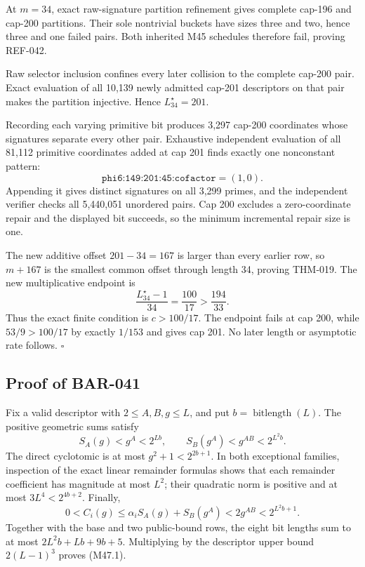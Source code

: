 \documentclass[11pt]{article}
\begin{document}
At \(m=34\), exact raw-signature partition refinement gives complete cap-196
and cap-200 partitions. Their sole nontrivial buckets have sizes three and
two, hence three and one failed pairs. Both inherited M45 schedules
therefore fail, proving REF-042.

Raw selector inclusion confines every later collision to the complete
cap-200 pair. Exact evaluation of all 10,139 newly admitted cap-201
descriptors on that pair makes the partition injective. Hence
\(L_{34}^{\star}=201\).

Recording each varying primitive bit produces 3,297 cap-200 coordinates
whose signatures separate every other pair. Exhaustive independent
evaluation of all 81,112 primitive coordinates added at cap 201 finds
exactly one nonconstant pattern:
\[
\texttt{phi6:149:201:45:cofactor}=(1,0).
\]
Appending it gives distinct signatures on all 3,299 primes, and the
independent verifier checks all 5,440,051 unordered pairs. Cap 200 excludes
a zero-coordinate repair and the displayed bit succeeds, so the minimum
incremental repair size is one.

The new additive offset \(201-34=167\) is larger than every earlier row, so
\(m+167\) is the smallest common offset through length 34, proving THM-019.
The new multiplicative endpoint is
\[
\frac{L_{34}^{\star}-1}{34}=\frac{100}{17}>\frac{194}{33}.
\]
Thus the exact finite condition is \(c>100/17\). The endpoint fails at cap
200, while \(53/9>100/17\) by exactly \(1/153\) and gives cap 201. No later
length or asymptotic rate follows. \(\square\)

\subsection{Proof of BAR-041}
\label{proof:BAR-041}

Fix a valid descriptor with \(2\le A,B,g\le L\), and put
\(b=\operatorname{bitlength}(L)\). The positive geometric sums satisfy
\[
S_A(g)<g^A<2^{Lb},\qquad
S_B(g^A)<g^{AB}<2^{L^2b}.
\]
The direct cyclotomic is at most \(g^2+1<2^{2b+1}\). In both exceptional
families, inspection of the exact linear remainder formulas shows that each
remainder coefficient has magnitude at most \(L^2\); their quadratic norm
is positive and at most \(3L^4<2^{4b+2}\). Finally,
\[
0<C_i(g)
\le\alpha_iS_A(g)+S_B(g^A)
<2g^{AB}<2^{L^2b+1}.
\]
Together with the base and two public-bound rows, the eight bit lengths sum
to at most \(2L^2b+Lb+9b+5\). Multiplying by the descriptor upper bound
\(2(L-1)^3\) proves (M47.1).
\end{document}
